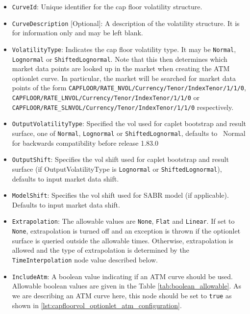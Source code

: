 \begin{itemize}
\item
\lstinline!CurveId!: Unique identifier for the cap floor volatility structure.

\item \lstinline!CurveDescription! [Optional]:
A description of the volatility structure. It is for information only and may be left blank.

\item \lstinline!VolatilityType!:
Indicates the cap floor volatility type. It may be \lstinline!Normal!, \lstinline!Lognormal! or \lstinline!ShiftedLognormal!. Note that this then determines which market data points are looked up in the market when creating the ATM optionlet curve. In particular, the market will be searched for market data points of the form \lstinline!CAPFLOOR/RATE_NVOL/Currency/Tenor/IndexTenor/1/1/0!, \lstinline!CAPFLOOR/RATE_LNVOL/Currency/Tenor/IndexTenor/1/1/0! or \lstinline!CAPFLOOR/RATE_SLNVOL/Currency/Tenor/IndexTenor/1/1/0! respectively.

\item \lstinline!OutputVolatilityType!: Specified the vol used for caplet bootstrap and result surface, one of {\tt Normal},
  {\tt Lognormal} or {\tt ShiftedLognormal}, defaults to {\ Normal} for backwards compatibility before release 1.83.0

\item \lstinline!OutputShift!: Specifies the vol shift used for caplet bootstrap and result surface (if OutputVolatilityType is 
{\tt Lognormal} or {\tt ShiftedLognormal}), defaults to input market data shift. 

\item \lstinline!ModelShift!: Specifies the vol shift used for SABR model (if applicable). Defaults to input market data shift. 

\item \lstinline!Extrapolation!:
The allowable values are \lstinline!None!, \lstinline!Flat! and \lstinline!Linear!. If set to \lstinline!None!, extrapolation is turned off and an exception is thrown if the optionlet surface is queried outside the allowable times. Otherwise, extrapolation is allowed and the type of extrapolation is determined by the \lstinline!TimeInterpolation! node value described below.

\item \lstinline!IncludeAtm!:
A boolean value indicating if an ATM curve should be used. Allowable boolean values are given in the Table \ref{tab:boolean_allowable}. As we are describing an ATM curve here, this node should be set to \lstinline!true! as shown in \ref{lst:capfloorvol_optionlet_atm_configuration}.


\end{itemize}
